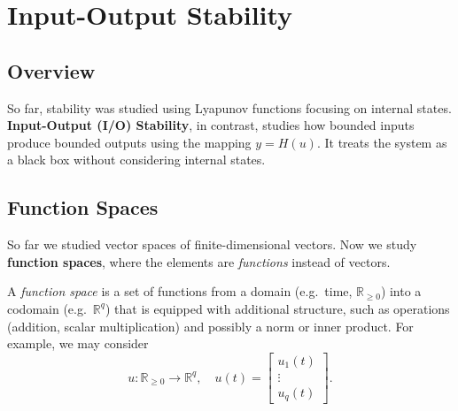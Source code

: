 \chapterspaceabove{6.75cm} %
\chapterspacebelow{7.25cm} %

\chapter{Input-Output Stability}

\section{Overview}

So far, stability was studied using Lyapunov functions focusing on internal states. \textbf{Input-Output (I/O) Stability}, in contrast, studies how bounded inputs produce bounded outputs using the mapping $y = H(u)$. It treats the system as a black box without considering internal states.  

\begin{center}
\end{center}

\section{Function Spaces}

So far we studied vector spaces of finite-dimensional vectors.  
Now we study \textbf{function spaces}, where the elements are \emph{functions} instead of vectors.  

\begin{definition}
A \emph{function space} is a set of functions from a domain (e.g.\ time, $\mathbb{R}_{\geq 0}$) into a codomain (e.g.\ $\mathbb{R}^q$) that is equipped with additional structure, such as operations (addition, scalar multiplication) and possibly a norm or inner product.  
For example, we may consider
\begin{equation}
u:\mathbb{R}_{\geq 0} \to \mathbb{R}^q, 
\quad 
u(t) =
\begin{bmatrix}
u_1(t) \\ \vdots \\ u_q(t)
\end{bmatrix}.
\end{equation}
\end{definition}

